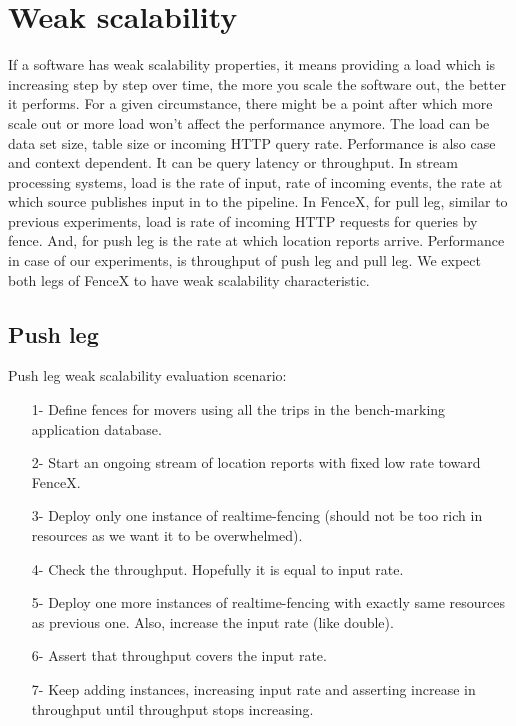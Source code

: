 \documentclass[a4]{report}
\begin{document}
    \section{Weak scalability}
    If a software has weak scalability properties, it means providing a load which is increasing step by step over
    time, the more you scale the software out, the better it performs.
    For a given circumstance, there might be a point after which more scale out or more load won't affect
    the performance anymore.
    The load can be data set size, table size or incoming HTTP query rate.
    Performance is also case and context dependent.
    It can be query latency or throughput.
    In stream processing systems, load is the rate of input, rate of incoming events, the rate at
    which source publishes input in to the pipeline.
    In FenceX, for pull leg, similar to previous experiments, load is rate of incoming HTTP requests for queries by
    fence.
    And, for push leg is the rate at which location reports arrive.
    Performance in case of our experiments, is throughput of push leg and pull leg.
    We expect both legs of FenceX to have weak scalability characteristic.

    \subsection{Push leg}
    Push leg weak scalability evaluation scenario:
    \begin{itemize}
        \item[1-] Define fences for movers using all the trips in the bench-marking application database.
        \item[2-] Start an ongoing stream of location reports with fixed low rate toward FenceX.
        \item[3-] Deploy only one instance of realtime-fencing (should not be too rich in resources as we want it to
        be overwhelmed).
        \item[4-] Check the throughput. Hopefully it is equal to input rate.
        \item[5-] Deploy one more instances of realtime-fencing with exactly same resources as previous one. Also,
        increase the input rate (like double).
        \item[6-] Assert that throughput covers the input rate.
        \item[7-] Keep adding instances, increasing input rate and asserting increase in throughput until throughput
        stops increasing.
    \end{itemize}
\end{document}
